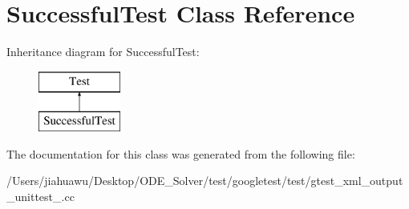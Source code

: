 \hypertarget{class_successful_test}{}\section{Successful\+Test Class Reference}
\label{class_successful_test}
Inheritance diagram for Successful\+Test\+:\begin{figure}[H]
\begin{center}
\leavevmode
\includegraphics[height=2.000000cm]{class_successful_test}
\end{center}
\end{figure}


The documentation for this class was generated from the following file\+:\begin{DoxyCompactItemize}
\item 
/\+Users/jiahuawu/\+Desktop/\+O\+D\+E\+\_\+\+Solver/test/googletest/test/gtest\+\_\+xml\+\_\+output\+\_\+unittest\+\_\+.\+cc\end{DoxyCompactItemize}
